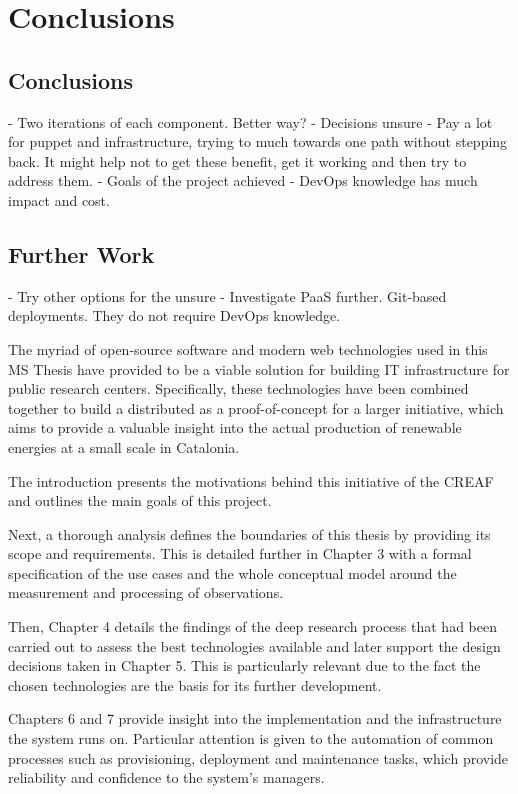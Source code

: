 \chapter{Conclusions}

\section{Conclusions}

- Two iterations of each component. Better way?
- Decisions unsure
- Pay a lot for puppet and infrastructure, trying to much towards one path without stepping back. It might help not to get these benefit, get it working and then try to address them.
- Goals of the project achieved
- DevOps knowledge has much impact and cost.

\section{Further Work}

- Try other options for the unsure
- Investigate PaaS further. Git-based deployments. They do not require DevOps knowledge.


The myriad of open-source software and modern web technologies used in this MS Thesis have provided to be a viable solution for building IT infrastructure for public research centers. Specifically, these technologies have been combined together to build a distributed as a proof-of-concept for a larger initiative, which aims to provide a valuable insight into the actual production of renewable energies at a small scale in Catalonia.

The introduction presents the motivations behind this initiative of the CREAF and outlines the main goals of this project.

Next, a thorough analysis defines the boundaries of this thesis by providing its scope and requirements. This is detailed further in Chapter 3 with a formal specification of the use cases and the whole conceptual model around the measurement and processing of observations.

Then, Chapter 4 details the findings of the deep research process that had been carried out to assess the best technologies available and later support the design decisions taken in Chapter 5. This is particularly relevant due to the fact the chosen technologies are the basis for its further development.

Chapters 6 and 7 provide insight into the implementation and the infrastructure the system runs on. Particular attention is given to the automation of common processes such as provisioning, deployment and maintenance tasks, which provide reliability and confidence to the system's managers.
